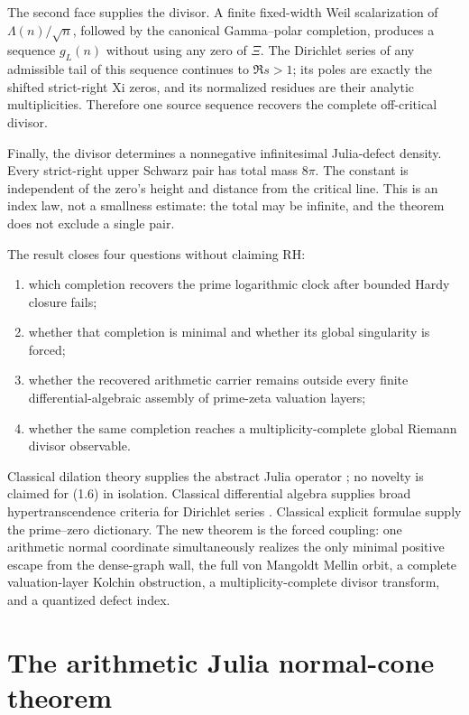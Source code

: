 \documentclass[11pt]{article}
\theoremstyle{definition}
\theoremstyle{remark}
\begin{document}
The second face supplies the divisor.  A finite fixed-width Weil scalarization of
\(\Lambda(n)/\sqrt n\), followed by the canonical Gamma--polar completion, produces a sequence
\(g_L(n)\) without using any zero of \(\Xi\).  The Dirichlet series of any admissible tail of
this sequence continues to \(\Re s>1\); its poles are exactly the shifted strict-right Xi zeros,
and its normalized residues are their analytic multiplicities.  Therefore one source sequence
recovers the complete off-critical divisor.

Finally, the divisor determines a nonnegative infinitesimal Julia-defect density.  Every
strict-right upper Schwarz pair has total mass \(8\pi\).  The constant is independent of the
zero's height and distance from the critical line.  This is an index law, not a smallness
estimate: the total may be infinite, and the theorem does not exclude a single pair.

The result closes four questions without claiming RH:
\begin{enumerate}[label=\textup{(\roman*)}]
\item which completion recovers the prime logarithmic clock after bounded Hardy closure fails;
\item whether that completion is minimal and whether its global singularity is forced;
\item whether the recovered arithmetic carrier remains outside every finite
differential-algebraic assembly of prime-zeta valuation layers;
\item whether the same completion reaches a multiplicity-complete global Riemann divisor
observable.
\end{enumerate}

Classical dilation theory supplies the abstract Julia operator
\cite{Halmos1950,SzNagyFoias2010}; no novelty is claimed for (1.6) in isolation.
Classical differential algebra supplies broad hypertranscendence criteria for Dirichlet series
\cite{Ostrowski1920,ShapiroSparer1986,Kolchin1973,AmouKatsurada2001,Pong2016,Nagoshi2016}.
Classical explicit formulae supply the prime--zero dictionary.  The new theorem is the forced
coupling: one arithmetic normal coordinate simultaneously realizes the only minimal positive
escape from the dense-graph wall, the full von Mangoldt Mellin orbit, a complete
valuation-layer Kolchin obstruction, a multiplicity-complete divisor transform, and a
quantized defect index.

\section{The arithmetic Julia normal-cone theorem}\label{sec:main}
\end{document}
